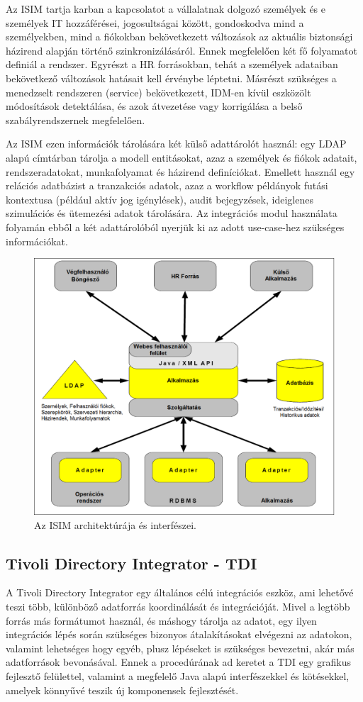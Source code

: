 Az ISIM tartja karban a kapcsolatot a vállalatnak dolgozó személyek és e személyek IT hozzáférései, jogosultságai között, gondoskodva mind a személyekben, mind a fiókokban bekövetkezett változások az aktuális biztonsági házirend alapján történő szinkronizálásáról. Ennek megfelelően két fő folyamatot definiál a rendszer.
Egyrészt a HR forrásokban, tehát a személyek adataiban bekövetkező változások hatásait kell érvénybe léptetni. Másrészt szükséges a menedzselt rendszeren (service) bekövetkezett, IDM-en kívül eszközölt módosítások detektálása, és azok átvezetése vagy korrigálása a belső szabályrendszernek megfelelően. 

Az ISIM ezen információk tárolására két külső adattárolót használ: egy LDAP alapú címtárban tárolja a modell entitásokat, azaz a személyek és fiókok adatait, rendszeradatokat, munkafolyamat és házirend definíciókat. Emellett használ egy relációs adatbázist a tranzakciós adatok, azaz a workflow példányok futási kontextusa (például aktív jog igénylések), audit bejegyzések, ideiglenes szimulációs és ütemezési adatok tárolására. Az integrációs modul használata folyamán ebből a két adattárolóból nyerjük ki az adott use-case-hez szükséges információkat.

\begin{figure}
	\centering
	\includegraphics[width=0.5\linewidth]{figures/ISIM_promo.png}
	\caption{Az ISIM architektúrája és interfészei.}
	\label{fig:isim-promo}
\end{figure}


\subsection{Tivoli Directory Integrator - TDI}
\label{subsec:TDI}
A Tivoli Directory Integrator egy általános célú integrációs eszköz, ami lehetővé teszi több, különböző adatforrás koordinálását és integrációját. Mivel a legtöbb forrás más formátumot használ, és máshogy tárolja az adatot, egy ilyen integrációs lépés során szükséges bizonyos átalakításokat elvégezni az adatokon, valamint lehetséges hogy egyéb, plusz lépéseket is szükséges bevezetni, akár más adatforrások bevonásával. Ennek a procedúrának ad keretet a TDI egy grafikus fejlesztő felülettel, valamint a megfelelő Java alapú interfészekkel és kötésekkel, amelyek könnyűvé teszik új komponensek fejlesztését.

